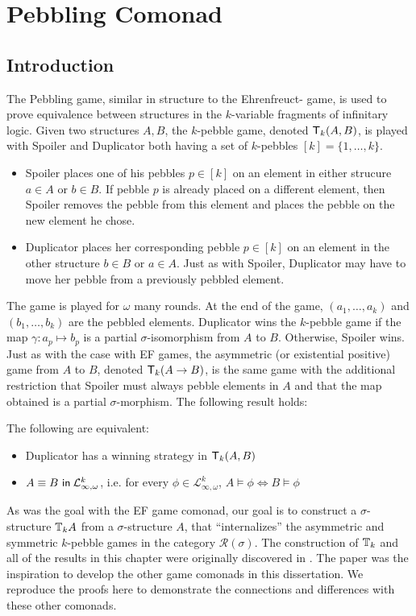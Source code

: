 \chapter{Pebbling Comonad}
\section{Introduction}
The Pebbling game, similar in structure to the Ehrenfreuct-{\Fraisse} game, is used to prove equivalence between structures in the $k$-variable fragments of infinitary logic. Given two structures $A,B$, the $k$-pebble game, denoted ${\mathsf{T}_{k}(A,B)}$, is played with Spoiler and Duplicator both having a set of $k$-pebbles $[k] = \{1,\dots,k\}$.  
\begin{itemize} 
\item Spoiler places one of his pebbles $p \in [k]$ on an element in either strucure $a \in A$ or $b \in B$. If pebble $p$ is already placed on a different element, then Spoiler removes the pebble from this element and places the pebble on the new element he chose.  
\item Duplicator places her corresponding pebble $p \in [k]$ on an element in the other structure $b \in B$ or $a \in A$. Just as with Spoiler, Duplicator may have to move her pebble from a previously pebbled element.
\end{itemize} 
The game is played for $\omega$ many rounds. At the end of the game, $(a_{1},\dots,a_{k})$ and $(b_{1},\dots,b_{k})$ are the pebbled elements. Duplicator wins the $k$-pebble game if the map $\gamma:a_{p} \longmapsto b_{p}$ is a partial $\sigma$-isomorphism from $A$ to $B$. Otherwise, Spoiler wins. Just as with the case with EF games, the asymmetric (or existential positive) game from $A$ to $B$, denoted ${\mathsf{T}_{k}(A \rightarrow B)}$, is the same game with the additional restriction that Spoiler must always pebble elements in $A$ and that the map obtained is a partial $\sigma$-morphism. The following result holds:
\begin{prop}
The following are equivalent:
\begin{itemize}
\item Duplicator has a winning strategy in ${\mathsf{T}_{k}(A,B)}$
\item ${A \equiv B \ \mathsf{in}\: \mathcal{L}^{k}_{\infty,\omega}}$, i.e. for every $\phi \in \mathcal{L}^{k}_{\infty,\omega}$, $A \vDash \phi \Leftrightarrow B \vDash \phi$
\end{itemize}
\end{prop}
As was the goal with the EF game comonad, our goal is to construct a $\sigma$-structure ${\mathbb{T}_{k}A}$ from a $\sigma$-structure $A$, that ``internalizes'' the asymmetric and symmetric $k$-pebble games in the category $\mathcal{R}(\sigma)$. The construction of ${\mathbb{T}_{k}}$ and all of the results in this chapter were originally discovered in \cite{Abramsky2017}. The paper \cite{Abramsky2017} was the inspiration to develop the other game comonads in this dissertation. We reproduce the proofs here to demonstrate the connections and differences with these other comonads.  
